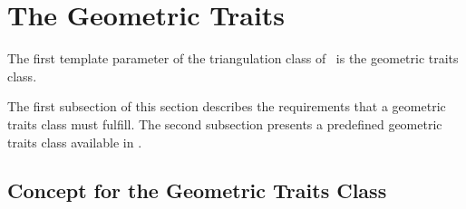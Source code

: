 \section{The Geometric Traits}
\label{Triangulation3-sec-Traits}

The first template parameter of the triangulation class
 of \cgal\ is the geometric traits class.

The first subsection of this section describes the requirements
that a geometric traits class must fulfill. The second subsection
presents a predefined geometric traits class available in \cgal.

	
	\subsection{Concept for the Geometric Traits Class}
	\label{Triangulation3-sec-concept-Traits}

